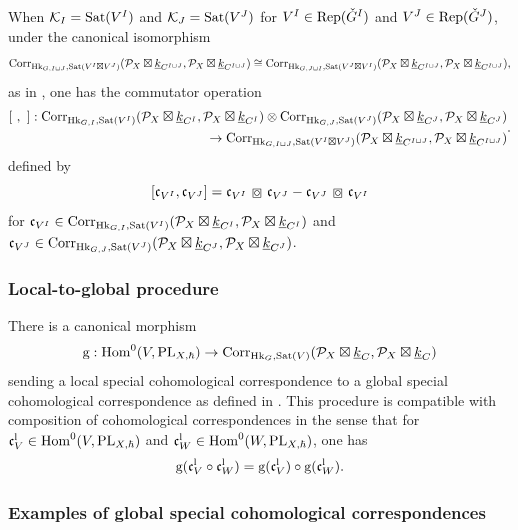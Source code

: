 \documentclass[reqno]{amsart}
\numberwithin{equation}{section}
\numberwithin{equation}{section}
\begin{document}
When $\mathcal{K}_I=\operatorname{Sat}(V^I)$ and $\mathcal{K}_J=\operatorname{Sat}(V^J)$ for $V^I\in\operatorname{Rep}(\check{G}^I)$ and $V^J\in\operatorname{Rep}(\check{G}^J)$, under the canonical isomorphism \[\mathrm{Corr}_{\operatorname{Hk}_{G,I\sqcup J},\operatorname{Sat}(V^I\boxtimes V^J)}(\mathcal{P}_X\boxtimes\underline{k}_{C^{I\sqcup J}},\mathcal{P}_X\boxtimes \underline{k}_{C^{I\sqcup J}})\cong \mathrm{Corr}_{\operatorname{Hk}_{G,J\sqcup I},\operatorname{Sat}(V^J\boxtimes V^I)}(\mathcal{P}_X\boxtimes\underline{k}_{C^{I\sqcup J}},\mathcal{P}_X\boxtimes \underline{k}_{C^{I\sqcup J}}), \] as in \cite[Conjecture\,4.45]{liu2025higherperiodintegralsderivatives}, one has the commutator operation \begin{equation}\begin{split}
    [~,~]:\mathrm{Corr}_{\operatorname{Hk}_{G,I},\operatorname{Sat}(V^I)}(\mathcal{P}_X\boxtimes\underline{k}_{C^I},\mathcal{P}_X\boxtimes\underline{k}_{C^I})\otimes \mathrm{Corr}_{\operatorname{Hk}_{G,J},\operatorname{Sat}(V^J)}(\mathcal{P}_X\boxtimes\underline{k}_{C^J},\mathcal{P}_X\boxtimes\underline{k}_{C^J}) \\  \to \mathrm{Corr}_{\operatorname{Hk}_{G,I\sqcup J},\operatorname{Sat}(V^I\boxtimes V^J)}(\mathcal{P}_X\boxtimes\underline{k}_{C^{I\sqcup J}},\mathcal{P}_X\boxtimes \underline{k}_{C^{I\sqcup J}})\end{split}.
\end{equation} defined by \[[\frc_{V^I},\frc_{V^J}]=\frc_{V^I}\boxcirc \frc_{V^J}-\frc_{V^J}\boxcirc \frc_{V^I}\] for $\mathfrak{c}_{V^I}\in \mathrm{Corr}_{\operatorname{Hk}_{G,I},\operatorname{Sat}(V^I)}(\mathcal{P}_X\boxtimes\underline{k}_{C^I},\mathcal{P}_X\boxtimes\underline{k}_{C^I})$ and $\mathfrak{c}_{V^J}\in \mathrm{Corr}_{\operatorname{Hk}_{G,J},\operatorname{Sat}(V^J)}(\mathcal{P}_X\boxtimes\underline{k}_{C^J},\mathcal{P}_X\boxtimes\underline{k}_{C^J})$.

\subsubsection{Local-to-global procedure}
There is a canonical morphism \begin{equation}\label{eq:globalization}\mathrm{g}:\operatorname{Hom}^0(V,\mathrm{PL}_{X,\hbar}) \to \mathrm{Corr}_{\operatorname{Hk}_{G},\operatorname{Sat}(V)}(\mathcal{P}_X\boxtimes\underline{k}_C,\mathcal{P}_X\boxtimes\underline{k}_C)\end{equation} sending a local special cohomological correspondence to a global special cohomological correspondence as defined in \cite[Definition\,4.40]{liu2025higherperiodintegralsderivatives}. This procedure is compatible with composition of cohomological correspondences in the sense that for $\mathfrak{c}_V^{\mathrm{l}}\in \operatorname{Hom}^0(V,\mathrm{PL}_{X,\hbar})$ and $\mathfrak{c}_W^{\mathrm{l}}\in \operatorname{Hom}^0(W,\mathrm{PL}_{X,\hbar})$, one has \begin{equation}\label{eq:ltogassoc}
    \mathrm{g}(\mathfrak{c}_V^{\mathrm{l}}\circ \mathfrak{c}_W^{\mathrm{l}})=\mathrm{g}(\mathfrak{c}_V^{\mathrm{l}})\circ \mathrm{g}(\mathfrak{c}_W^{\mathrm{l}}).
\end{equation}


\subsubsection{Examples of global special cohomological correspondences}
\end{document}
